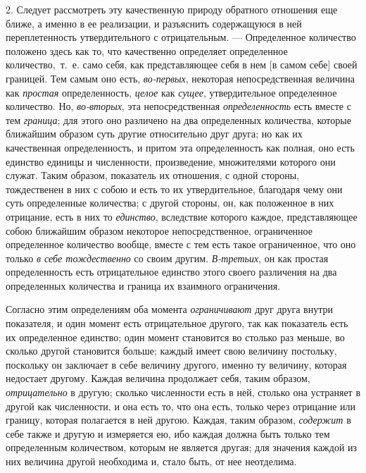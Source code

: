 2. Следует рассмотреть эту качественную природу обратного отношения еще
ближе, а именно в ее реализации, и разъяснить содержащуюся в ней
переплетенность утвердительного с отрицательным. — Определенное количество
положено здесь как то, что качественно определяет определенное
количество,~т.~е. само себя, как представляющее себя в нем [в самом себе]
своей границей. Тем самым оно есть, {\em во-первых},
некоторая непосредственная величина как {\em простая}
определенность, {\em целое} как
{\em сущее}, утвердительное определенное количество.
Но, {\em во-вторых}, эта непосредственная
{\em определенность} есть вместе с тем
{\em граница}; для этого оно различено на два
определенных количества, которые ближайшим образом суть другие относительно
друг друга; но как их качественная определенность, и притом эта
определенность как полная, оно есть единство единицы и численности,
произведение, множителями которого они служат. Таким образом, показатель их
отношения, с одной стороны, тождественен в них с собою и есть то их
утвердительное, благодаря чему они суть определенные количества; с другой
стороны, он, как положенное в них отрицание, есть в них то
{\em единство}, вследствие которого каждое,
представляющее собою ближайшим образом некоторое непосредственное,
ограниченное определенное количество вообще, вместе с тем есть такое
ограниченное, что оно только {\em в себе тождественно}
со своим другим. {\em В-третьих}, он как простая
определенность есть отрицательное единство этого своего различения на два
определенных количества и граница их взаимного ограничения.

Согласно этим определениям оба момента
{\em ограничивают} друг друга внутри показателя, и один
момент есть отрицательное другого, так как показатель есть их определенное
единство; один момент становится во столько раз меньше, во сколько другой
становится больше; каждый имеет свою величину постольку, поскольку он
заключает в себе величину другого, именно ту величину, которая недостает
другому. Каждая величина продолжает себя, таким образом,
{\em отрицательно} в другую; сколько численности есть в
ней, столько она устраняет в другой как численности, и она есть то, что она
есть, только через отрицание или границу, которая полагается в ней другою.
Каждая, таким образом, {\em содержит} в себе также и
другую и измеряется ею, ибо каждая должна быть только тем определенным
количеством, которым не является другая; для значения каждой из них
величина другой необходима и, стало быть, от нее неотделима.

